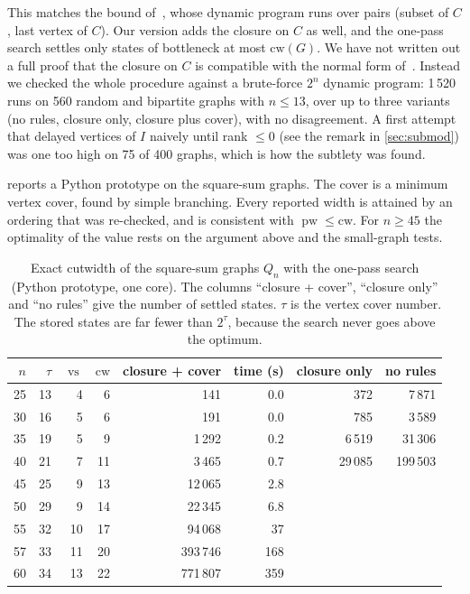 \documentclass[11pt]{article}
\theoremstyle{definition}
\newcommand{\vs}{\operatorname{vs}}
\newcommand{\pw}{\operatorname{pw}}
\begin{document}
This matches the bound of~\cite{CLPPS14}, whose dynamic program runs over
pairs (subset of $C$, last vertex of $C$). Our version adds the closure on
$C$ as well, and the one-pass search settles only states of bottleneck at
most $\mathrm{cw}(G)$. We have not written out a full proof that the
closure on $C$ is compatible with the normal form of~\cite{CLPPS14}. Instead
we checked the whole procedure against a brute-force $2^n$ dynamic program:
1\,520 runs on 560 random and bipartite graphs with $n\le13$, over up to
three variants (no rules, closure only, closure plus cover), with no
disagreement.
A first attempt that delayed vertices of $I$ naively until rank
$\le0$ (see the remark in \cref{sec:submod}) was one too high on 75 of 400
graphs, which is how the subtlety was found.

 reports a Python prototype on the square-sum graphs. The
cover is a minimum vertex cover, found by simple branching. Every reported
width is attained by an ordering that was re-checked, and is consistent with
$\pw\le\mathrm{cw}$. For $n\ge45$ the optimality of the value rests on the
argument above and the small-graph tests.

\begin{table}[ht]
\centering
\small
\begin{tabular}{rrrrrrrr}
\toprule
$n$ & $\tau$ & $\vs$ & $\mathrm{cw}$ & closure + cover & time (s) & closure only & no rules\\
\midrule
25 & 13 & 4 & 6 & 141 & 0.0 & 372 & 7\,871\\
30 & 16 & 5 & 6 & 191 & 0.0 & 785 & 3\,589\\
35 & 19 & 5 & 9 & 1\,292 & 0.2 & 6\,519 & 31\,306\\
40 & 21 & 7 & 11 & 3\,465 & 0.7 & 29\,085 & 199\,503\\
45 & 25 & 9 & 13 & 12\,065 & 2.8 & & \\
50 & 29 & 9 & 14 & 22\,345 & 6.8 & & \\
55 & 32 & 10 & 17 & 94\,068 & 37 & & \\
57 & 33 & 11 & 20 & 393\,746 & 168 & & \\
60 & 34 & 13 & 22 & 771\,807 & 359 & & \\
\bottomrule
\end{tabular}
\caption{Exact cutwidth of the square-sum graphs $Q_n$ with the one-pass
search (Python prototype, one core). The columns ``closure + cover'',
``closure only'' and ``no rules'' give the number of settled states.
$\tau$ is the vertex cover number. The stored states are far fewer than
$2^{\tau}$, because the search never goes above the optimum.}\label{tab:cw}
\end{table}
\end{document}
